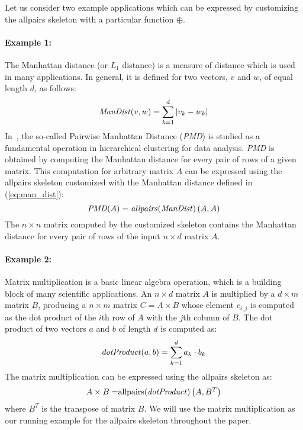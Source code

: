 \vspace{6em}
Let us consider two example applications which can be expressed by customizing the allpairs skeleton with a particular function $\oplus$.

\paragraph{Example 1:}
The Manhattan distance (or $L_1$ distance) is a measure of distance which is used in many applications.
In general, it is defined for two vectors, $v$ and $w$, of equal length $d$, as follows:
\begin{equation}
  \label{eq:man_dist}
  \mbox{\emph{ManDist}}(v, w) = \sum_{k=1}^d | v_k - w_k | 
\end{equation}
In~\cite{DaDQR-09}, the so-called Pairwise Manhattan Distance (\emph{PMD}) is studied as a fundamental operation in hierarchical clustering for data analysis.
\emph{PMD} is obtained by computing the Manhattan distance for every pair of rows of a given matrix.
This computation for arbitrary matrix $A$ can be expressed using the allpairs skeleton customized with the Manhattan distance defined in (\ref{eq:man_dist}):
\begin{equation}
  \mbox{\emph{PMD}}(A) = \mbox{\emph{allpairs}}(\mbox{\emph{ManDist}})\left(A, A\right)
\end{equation}
The $n\times n$ matrix computed by the customized skeleton contains the Manhattan distance for every pair of rows of the input $n\times d$ matrix $A$.

\paragraph{Example 2:}
Matrix multiplication is a basic linear algebra operation, which is a building block of many scientific applications.
An $n\times d$ matrix $A$ is multiplied by a $d\times m$ matrix $B$, producing a $n\times m$ matrix $C=A\times B$ whose element $c_{i,j}$ is computed as the dot product of the $i$th row of $A$ with the $j$th column of $B$.
The dot product of two vectors $a$ and $b$ of length $d$ is computed as:
\begin{equation}
  \mbox{\emph{dotProduct}} (a,b) = \sum_{k=1}^d a_k \cdot b_k
\end{equation}
The matrix multiplication can be expressed using the allpairs skeleton as:
\begin{equation}
  A\times B = \allpairs(\dotProduct)\left(A, B^T\right)
  \label{eq:mat_mult_allpairs}
\end{equation}
where $B^T$ is the transpose of matrix $B$.
We will use the matrix multiplication as our running example for the allpairs skeleton throughout the paper.

